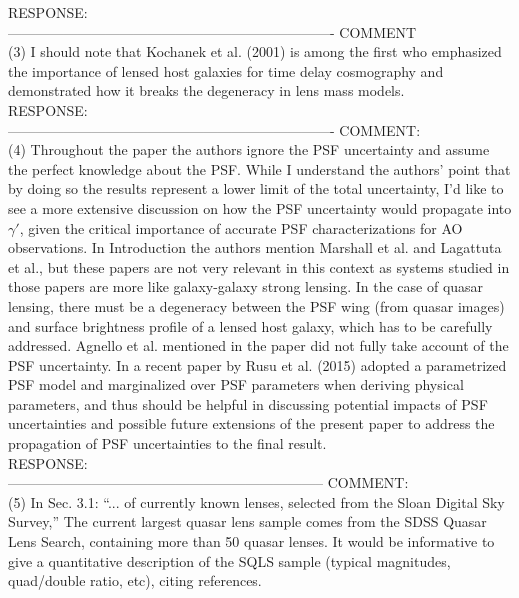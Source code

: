 \documentclass[numberedappendix,12pt,preprint]{emulateapj}
\begin{document}
RESPONSE:
\\

----------------------------------------------------------------------
COMMENT
\\
(3) I should note that Kochanek et al. (2001) is among the first who emphasized the importance of lensed host galaxies for time delay cosmography and demonstrated how it breaks the degeneracy in lens mass models.
\\

RESPONSE:
\\ 


----------------------------------------------------------------------
COMMENT:
\\
(4) Throughout the paper the authors ignore the PSF uncertainty and assume the perfect knowledge about the PSF. While I understand the authors’ point that by doing so the results represent a lower limit of the total uncertainty, I’d like to see a more extensive discussion on how the PSF uncertainty would propagate into $\gamma'$, given the critical importance of accurate PSF characterizations for AO observations. In Introduction the authors mention Marshall et al. and Lagattuta et al., but these papers are not very relevant in this context as systems studied in those papers are more like galaxy-galaxy strong lensing. In the case of quasar lensing, there must be a degeneracy between the PSF wing (from quasar images) and surface brightness profile of a lensed host galaxy, which has to be carefully addressed. Agnello et al. mentioned in the paper did not fully take account of the PSF uncertainty. In a recent paper by Rusu et al. (2015) adopted a parametrized PSF model and marginalized over PSF parameters when deriving physical parameters, and thus should be helpful in discussing potential impacts of PSF uncertainties and possible future extensions of the present paper to address the propagation of PSF uncertainties to the final result.
\\

RESPONSE:
\\ 
--------------------------------------------------------------------
COMMENT:
\\
(5) In Sec. 3.1: “... of currently known lenses, selected from the Sloan Digital Sky Survey,” The current largest quasar lens sample comes from the SDSS Quasar Lens Search, containing more than 50 quasar lenses. It would be informative to give a quantitative description of the SQLS sample (typical magnitudes, quad/double ratio, etc), citing references.
\\
\end{document}
